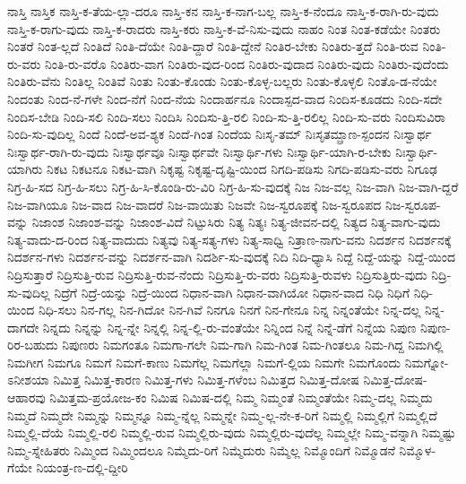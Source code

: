 {ನಾಸ್ತಿ
ನಾಸ್ತಿಕ
ನಾಸ್ತಿ-ಕ-ತೆಯ-ಲ್ಲಾ-ದರೂ
ನಾಸ್ತಿ-ಕನ
ನಾಸ್ತಿ-ಕ-ನಾಗ-ಬಲ್ಲ
ನಾಸ್ತಿ-ಕ-ನೆಂದೂ
ನಾಸ್ತಿ-ಕ-ರಾಗಿ-ರು-ವುದು
ನಾಸ್ತಿ-ಕ-ರಾಗು-ವುದು
ನಾಸ್ತಿ-ಕ-ರಾದರು
ನಾಸ್ತಿ-ಕರು
ನಾಸ್ತಿ-ಕ-ವೆ-ನಿಸು-ವುದು
ನಾಹಂ
ನಿಂತ
ನಿಂತ-ಕಡೆಯೇ
ನಿಂತರು
ನಿಂತರೆ
ನಿಂತ-ಲ್ಲದೆ
ನಿಂತಿದೆ
ನಿಂತಿ-ದೆಯೇ
ನಿಂತಿ-ದ್ದಾರೆ
ನಿಂತಿ-ದ್ದೇನೆ
ನಿಂತಿರ-ಬೇಕು
ನಿಂತಿರು-ತ್ತದೆ
ನಿಂತಿ-ರುವ
ನಿಂತಿ-ರು-ವರು
ನಿಂತಿ-ರು-ವರೊ
ನಿಂತಿರು-ವಾಗ
ನಿಂತಿರು-ವುದ-ರಿಂದ
ನಿಂತಿರು-ವುದಾದ
ನಿಂತಿರು-ವುದು
ನಿಂತಿರು-ವುದೆಂದು
ನಿಂತಿರು-ವೆನು
ನಿಂತಿಲ್ಲ
ನಿಂತಿವೆ
ನಿಂತು
ನಿಂತು-ಕೊಂಡು
ನಿಂತು-ಕೊಳ್ಳ-ಬಲ್ಲರು
ನಿಂತು-ಕೊಳ್ಳಲಿ
ನಿಂತೊ-ಡ-ನೆಯೇ
ನಿಂದಂತು
ನಿಂದ-ನೆ-ಗಳೇ
ನಿಂದ-ನೆಗೆ
ನಿಂದ-ನೆಯ
ನಿಂದಾರ್ಹನೂ
ನಿಂದಾಸ್ಪದ-ವಾದ
ನಿಂದಿಸ-ಕೂಡದು
ನಿಂದಿ-ಸದೇ
ನಿಂದಿಸ-ಬೇಡಿ
ನಿಂದಿ-ಸಲಿ
ನಿಂದಿ-ಸಲು
ನಿಂದಿಸಿ
ನಿಂದಿಸು-ತ್ತಿ-ರಲಿ
ನಿಂದಿ-ಸು-ತ್ತಿ-ರಲಿಲ್ಲ
ನಿಂದಿ-ಸು-ವರು
ನಿಂದಿಸುವಿರಾ
ನಿಂದಿ-ಸು-ವುದಿಲ್ಲ
ನಿಂದೆ
ನಿಂದೆ-ಅವ-ಶ್ಯಕ
ನಿಂದೆ-ಗಿಂತ
ನಿಂದೆಯ
ನಿಃಸೃ-ತಮ್
ನಿಃಸೃತಮ್ಪ್ರಾಣ-ಸ್ಪಂದನ
ನಿಃಸ್ವಾರ್ಥ
ನಿಃಸ್ವಾರ್ಥ-ರಾಗಿ-ರು-ವುದು
ನಿಃಸ್ವಾರ್ಥವೂ
ನಿಃಸ್ವಾರ್ಥವೇ
ನಿಃಸ್ವಾರ್ಥಿ-ಗಳು
ನಿಃಸ್ವಾರ್ಥಿ-ಯಾಗಿ-ರ-ಬೇಕು
ನಿಃಸ್ವಾರ್ಥಿ-ಯಾಗಿರು
ನಿಕಟ
ನಿಕಟನೂ
ನಿಕಟ-ವಾಗಿ
ನಿಕೃಷ್ಟ
ನಿಕೃಷ್ಟ-ದೃಷ್ಟಿ-ಯಿಂದ
ನಿಗದಿ-ಪಡಿಸು
ನಿಗದಿ-ಪಡಿಸು-ವರು
ನಿಗೂಢ
ನಿಗ್ರ-ಹಿ-ಸದ
ನಿಗ್ರ-ಹಿ-ಸಲು
ನಿಗ್ರ-ಹಿ-ಸಿ-ಕೊಂಡಿ-ರು-ವಿರಿ
ನಿಗ್ರ-ಹಿ-ಸು-ವುದಕ್ಕೆ
ನಿಜ
ನಿಜ-ವಲ್ಲ
ನಿಜ-ವಾಗಿ
ನಿಜ-ವಾಗಿ-ದ್ದರೆ
ನಿಜ-ವಾಗಿಯೂ
ನಿಜ-ವಾದ
ನಿಜ-ವಾದರೆ
ನಿಜ-ವಾಯಿತು
ನಿಜವೇ
ನಿಜ-ಸ್ವರೂಪಕ್ಕೆ
ನಿಜ-ಸ್ವರೂಪದ
ನಿಜ-ಸ್ವರೂಪ-ವನ್ನು
ನಿಜಾಂಶ
ನಿಜಾಂಶ-ವನ್ನು
ನಿಜಾಂಶ-ವಿದೆ
ನಿಟ್ಟುಸಿರು
ನಿತ್ಯ
ನಿತ್ಯಃ
ನಿತ್ಯ-ಜೀವನ-ದಲ್ಲಿ
ನಿತ್ಯದ
ನಿತ್ಯ-ವಾಗು-ವುದು
ನಿತ್ಯ-ವಾದು-ದ-ರಿಂದ
ನಿತ್ಯ-ವಾದುದು
ನಿತ್ಯವು
ನಿತ್ಯ-ಸತ್ಯ-ಗಳು
ನಿತ್ಯ-ಸಾಧ್ವಿ
ನಿತ್ರಾಣ-ನಾಗು-ವನು
ನಿದರ್ಶನ
ನಿದರ್ಶನಕ್ಕೆ
ನಿದರ್ಶನ-ಗಳು
ನಿದರ್ಶನ-ವನ್ನು
ನಿದರ್ಶನ-ವಾಗಿ
ನಿದರ್ಶಿ-ಸು-ವುದಕ್ಕೆ
ನಿದಿ
ನಿದಿ-ಧ್ಯಾಸಿ
ನಿದ್ದೆ
ನಿದ್ದೆ-ಯನ್ನು
ನಿದ್ದೆ-ಯಿಂದ
ನಿದ್ರಿಸುತ್ತಾರೆ
ನಿದ್ರಿಸುತ್ತಿ-ರುವ
ನಿದ್ರಿಸುತ್ತಿ-ರುವ-ನೆಂದು
ನಿದ್ರಿಸುತ್ತಿ-ರು-ವರು
ನಿದ್ರಿಸುತ್ತಿ-ರುವಳು
ನಿದ್ರಿಸುತ್ತಿರು-ವುದು
ನಿದ್ರಿ-ಸು-ವುದಿಲ್ಲ
ನಿದ್ರೆಗೆ
ನಿದ್ರೆ-ಯನ್ನು
ನಿದ್ರೆ-ಯಿಂದ
ನಿಧಾನ-ವಾಗಿ
ನಿಧಾನ-ವಾಗಿಯೋ
ನಿಧಾನ-ವಾದ
ನಿಧಿ
ನಿಧಿಗೆ
ನಿಧಿ-ಯಿಂದ
ನಿಧಿ-ಸಲು
ನಿನ-ಗಲ್ಲ
ನಿನ-ಗಿದೋ
ನಿನ-ಗಿವೆ
ನಿನಗೂ
ನಿನಗೆ
ನಿನ-ಗೇನೂ
ನಿನ್ನ
ನಿನ್ನಂತೆಯೇ
ನಿನ್ನ-ದಲ್ಲ
ನಿನ್ನ-ದಾಗದೇ
ನಿನ್ನದು
ನಿನ್ನನ್ನು
ನಿನ್ನ-ನ್ನೇ
ನಿನ್ನಲ್ಲಿ
ನಿನ್ನ-ಲ್ಲಿ-ರು-ವಂತೆಯೇ
ನಿನ್ನಿಂದ
ನಿನ್ನೆ
ನಿನ್ನೆ-ಡೆಗೆ
ನಿನ್ನೆಯ
ನಿಪುಣ
ನಿಪುಣ-ರಿರ-ಬಹುದು
ನಿಪುಣರು
ನಿಮಗಂತೂ
ನಿಮಗಾ-ಗಲೇ
ನಿಮ-ಗಾಗಿ
ನಿಮ-ಗಿಂತ
ನಿಮ-ಗಿಂತಲೂ
ನಿಮ-ಗಿದ್ದ
ನಿಮಗಿಲ್ಲಿ
ನಿಮಗೀಗ
ನಿಮಗೂ
ನಿಮಗೆ
ನಿಮಗೆ-ಕಾಣು
ನಿಮಗೆಲ್ಲ
ನಿಮಗೆಲ್ಲಾ
ನಿಮಗೆ-ಲ್ಲಿಯ
ನಿಮಗೇ
ನಿಮಗೊಂದು
ನಿಮಗ್ನೋ-ಽನೀಶಯಾ
ನಿಮಿತ್ತ
ನಿಮಿತ್ತ-ಕಾರಣ
ನಿಮಿತ್ತ-ಗಳು
ನಿಮಿತ್ತ-ಗಳೆಂಬ
ನಿಮಿತ್ತದ
ನಿಮಿತ್ತ-ದೋಷ
ನಿಮಿತ್ತ-ದೋಷ-ಆಹಾರವು
ನಿಮಿತ್ತಮ-ಪ್ರಯೋಜ-ಕಂ
ನಿಮಿಷ
ನಿಮಿಷ-ದಲ್ಲಿ
ನಿಮ್ಮ
ನಿಮ್ಮಂತೆ
ನಿಮ್ಮಂತೆಯೇ
ನಿಮ್ಮ-ದಲ್ಲ
ನಿಮ್ಮದು
ನಿಮ್ಮದೆ
ನಿಮ್ಮದೇ
ನಿಮ್ಮನ್ನು
ನಿಮ್ಮನ್ನೂ
ನಿಮ್ಮ-ನ್ನೆಲ್ಲ
ನಿಮ್ಮನ್ನೇ
ನಿಮ್ಮ-ಲ್ಲ-ನೇ-ಕ-ರಿಗೆ
ನಿಮ್ಮಲ್ಲಿ
ನಿಮ್ಮಲ್ಲಿಗೆ
ನಿಮ್ಮಲ್ಲಿದೆ
ನಿಮ್ಮಲ್ಲಿ-ದೆಯೆ
ನಿಮ್ಮಲ್ಲಿ-ರಲಿ
ನಿಮ್ಮಲ್ಲಿ-ರುವ
ನಿಮ್ಮಲ್ಲಿರು-ವುದು
ನಿಮ್ಮಲ್ಲಿರು-ವುದೆಲ್ಲ
ನಿಮ್ಮಲ್ಲೇ
ನಿಮ್ಮ-ವನ್ನಾಗಿ
ನಿಮ್ಮಷ್ಟು
ನಿಮ್ಮ-ಸ್ನೇಹಿತರು
ನಿಮ್ಮಿಂದ
ನಿಮ್ಮಿಂದಲೂ
ನಿಮ್ಮೆದು-ರಿಗೆ
ನಿಮ್ಮೆದುರು
ನಿಮ್ಮೆಲ್ಲ
ನಿಮ್ಮೊಂದಿಗೆ
ನಿಮ್ಮೊಡನೆ
ನಿಮ್ಮೊಳ-ಗೆಯೇ
ನಿಯಂತ್ರ-ಣ-ದಲ್ಲಿ-ದ್ದೀರಿ
}
